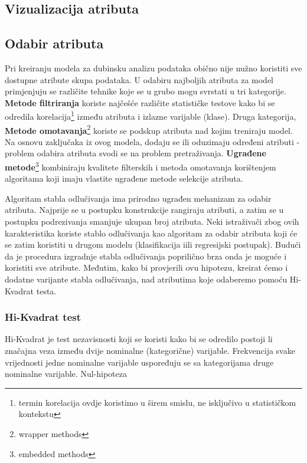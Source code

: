 \subsection{Vizualizacija atributa}

\subsection{Odabir atributa}
Pri kreiranju modela za dubinsku analizu podataka obično nije nužno koristiti sve dostupne atribute skupa podataka. U odabiru najboljih atributa za model primjenjuju se različite tehnike koje se u grubo mogu svrstati u tri kategorije. \textbf{Metode filtriranja} koriste najčešće različite statističke testove kako bi se odredila korelacija\footnote{termin korelacija ovdje koristimo u širem smislu, ne isključivo u statističkom kontekstu} između atributa i izlazne varijable (klase). Druga kategorija, \textbf{Metode omotavanja}\footnote{wrapper methods} koriste se podskup atributa nad kojim treniraju model. Na osnovu zaključaka iz ovog modela, dodaju se ili oduzimaju određeni atributi - problem odabira atributa svodi se na problem pretraživanja. \textbf{Ugrađene metode}\footnote{embedded methods} kombiniraju kvalitete filterskih i metoda omotavanja korištenjem algoritama koji imaju vlastite ugrađene metode selekcije atributa.

Algoritam stabla odlučivanja ima prirodno ugrađen mehanizam za odabir atributa. Najprije se u postupku konstrukcije rangiraju atributi, a zatim se u postupku podrezivanja smanjuje ukupan broj atributa. Neki istraživači zbog ovih karakteristika koriste stablo odlučivanja kao algoritam za odabir atributa koji će se zatim koristiti u drugom modelu (klasifikacija iili regresijski postupak). Budući da je procedura izgradnje stabla odlučivanja poprilično brza onda je moguće i koristiti sve atribute. Međutim, kako bi provjerili ovu hipotezu, kreirat ćemo i dodatne varijante stabla odlučivanja, nad atributima koje odaberemo pomoću Hi-Kvadrat testa.
\subsubsection{Hi-Kvadrat test}
Hi-Kvadrat je test nezavisnosti koji se koristi kako bi se odredilo postoji li značajna veza između dvije nominalne (kategorične) varijable. Frekvencija svake vrijednosti jedne nominalne varijable uspoređuju se sa kategorijama druge nominalne varijable. Nul-hipoteza 
